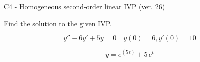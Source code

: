 \begin{exercise}
  \begin{exerciseTitle}C4 - Homogeneous second-order linear IVP (ver. 26)\end{exerciseTitle}
  \begin{exerciseStatement}
    
Find the solution to the given IVP.

    
\[y''-6y'+5y = 0 \hspace{1em} y(0) = 6 , y'(0) = 10\]

  \end{exerciseStatement}
  \begin{exerciseAnswer}
    
\[y= e^{\left(5 \, t\right)} + 5 \, e^{t}\]

  \end{exerciseAnswer}
\end{exercise}